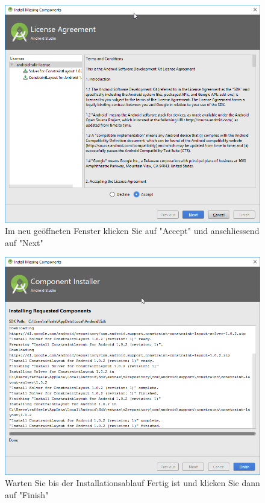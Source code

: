 \documentclass[a4paper,10pt,xetex]{article}
\begin{document}
\begin{figure}
  \centering
  \includegraphics[width=\textwidth]{Installation/2-7}
  \caption{Im neu geöffneten Fenster klicken Sie auf "Accept" und anschliessend auf "Next"}
\end{figure}

\begin{figure}
  \centering
  \includegraphics[width=\textwidth]{Installation/2-8}
  \caption{Warten Sie bis der Installationsablauf Fertig ist und klicken Sie dann auf "Finish"}
\end{figure}
\end{document}

